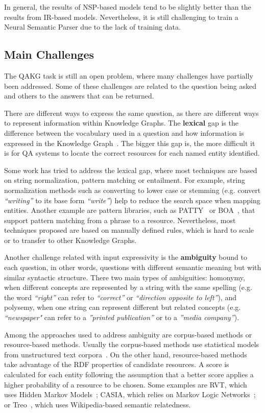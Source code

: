 In general, the results of NSP-based models tend to be slightly better than the results from 
IR-based models. Nevertheless, it is still challenging to train a Neural Semantic Parser due to 
the lack of training data.

\subsection{Main Challenges}
The QAKG task is still an open problem, where many challenges have partially been addressed. 
Some of these challenges are related to the question being asked and others to the answers that 
can be returned. 

There are different ways to express the same question, as there are different ways to represent 
information within Knowledge Graphs. The \textbf{lexical} gap is the difference between the 
vocabulary used in a question and how information is expressed in the Knowledge 
Graph~\cite{semPar:lexical-gap-HakimovUWC15}. The bigger this gap is, the more difficult it is 
for QA systems to locate the correct resources for each named entity identified. 

Some work has tried to address the lexical gap, where most techniques are based on string 
normalization, pattern matching or entailment. For example, string normalization methods such 
as converting to lower case or stemming (e.g. convert \textit{“writing”} to its base form 
\textit{“write”}) help to reduce the search space when mapping entities. Another example are 
pattern libraries, such as PATTY~\cite{qa:NakasholeWS12} or BOA~\cite{qa:GerberN12}, that 
support pattern matching from a phrase to a resource. Nevertheless, most techniques proposed 
are based on manually defined rules, which is hard to scale or to transfer to other Knowledge 
Graphs.

Another challenge related with input expressivity is the \textbf{ambiguity} bound to each 
question, in other words, questions with different semantic meaning but with similar syntactic 
structure. There two main types of ambiguities: homonymy, when different concepts are 
represented by a string with the same spelling (e.g. the word \textit{“right”} can refer to 
\textit{“correct”} or \textit{“direction opposite to left”}), and polysemy, when one string can 
represent different but related concepts (e.g. \textit{“newspaper"} can refer to a 
\textit{”printed publication”} or to a \textit{”media company”}). 

Among the approaches used to address ambiguity are corpus-based methods or resource-based 
methods. Usually the corpus-based methods use statistical models from unstructured text 
corpora~\cite{qa:shirai1997,qa:ShenYYJLC11}. On the other hand, resource-based methods take 
advantage of the RDF properties of candidate resources. A score is calculated for each entity 
following the assumption that a better score applies a higher probability of a resource to be 
chosen. Some examples are RVT, which uses Hidden Markov Models~\cite{qa:GiannoneBB13}; CASIA, 
which relies on Markov Logic Networks~\cite{qa:shizhu2014casia}; or Treo~\cite{qa:freitas2011treo,
qa:FreitasOOSC13}, which uses Wikipedia-based semantic relatedness.

